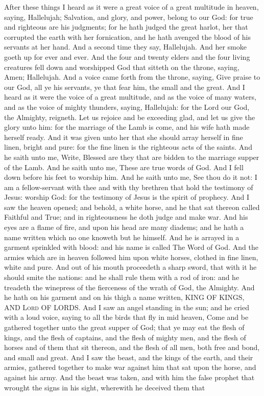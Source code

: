 After these things I heard as it were a great voice of a great multitude in heaven, saying, Hallelujah; Salvation, and glory, and power, belong to our God: for true and righteous are his judgments; for he hath judged the great harlot, her that corrupted the earth with her fornication, and he hath avenged the blood of his servants at her hand.  And a second time they say, Hallelujah. And her smoke goeth up for ever and ever. And the four and twenty elders and the four living creatures fell down and worshipped God that sitteth on the throne, saying, Amen; Hallelujah. And a voice came forth from the throne, saying, Give praise to our God, all ye his servants, ye that fear him, the small and the great.  And I heard as it were the voice of a great multitude, and as the voice of many waters, and as the voice of mighty thunders, saying, Hallelujah: for the Lord our God, the Almighty, reigneth. Let us rejoice and be exceeding glad, and let us give the glory unto him: for the marriage of the Lamb is come, and his wife hath made herself ready. And it was given unto her that she should array herself in fine linen, bright and pure: for the fine linen is the righteous acts of the saints.  And he saith unto me, Write, Blessed are they that are bidden to the marriage supper of the Lamb. And he saith unto me, These are true words of God. And I fell down before his feet to worship him. And he saith unto me, See thou do it not: I am a fellow-servant with thee and with thy brethren that hold the testimony of Jesus: worship God: for the testimony of Jesus is the spirit of prophecy.  And I saw the heaven opened; and behold, a white horse, and he that sat thereon called Faithful and True; and in righteousness he doth judge and make war. And his eyes are a flame of fire, and upon his head are many diadems; and he hath a name written which no one knoweth but he himself. And he is arrayed in a garment sprinkled with blood: and his name is called The Word of God. And the armies which are in heaven followed him upon white horses, clothed in fine linen, white and pure. And out of his mouth proceedeth a sharp sword, that with it he should smite the nations: and he shall rule them with a rod of iron: and he treadeth the winepress of the fierceness of the wrath of God, the Almighty. And he hath on his garment and on his thigh a name written, KING OF KINGS, AND \textsc{Lord} OF LORDS.  And I saw an angel standing in the sun; and he cried with a loud voice, saying to all the birds that fly in mid heaven, Come and be gathered together unto the great supper of God; that ye may eat the flesh of kings, and the flesh of captains, and the flesh of mighty men, and the flesh of horses and of them that sit thereon, and the flesh of all men, both free and bond, and small and great.  And I saw the beast, and the kings of the earth, and their armies, gathered together to make war against him that sat upon the horse, and against his army. And the beast was taken, and with him the false prophet that wrought the signs in his sight, wherewith he deceived them that 